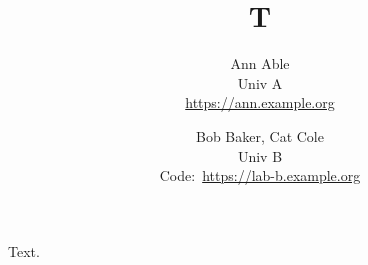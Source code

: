\documentclass{article}
\title{T}
\author{Ann Able \\ Univ A \\ \url{https://ann.example.org} \and Bob Baker, Cat Cole \\ Univ B \\
Code:~\url{https://lab-b.example.org}}
\begin{document}
\maketitle
Text.
\end{document}
